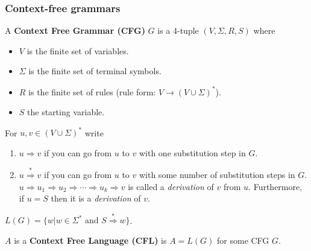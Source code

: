 \documentclass[11pt]{article}
\begin{document}
\subsubsection{Context-free grammars}
\begin{definition}
A \textbf{Context Free Grammar (CFG)} $G$ is a 4-tuple $(V,\Sigma,R,S)$ where
\begin{itemize}
    \item $V$ is the finite set of variables.
    \item $\Sigma$ is the finite set of terminal symbols.
    \item $R$ is the finite set of rules (rule form: $V\to (V\cup \Sigma)^{\ast}$).
    \item $S$ the starting variable.
\end{itemize}
For $u,v\in(V\cup\Sigma)^{\ast}$ write
\begin{enumerate}
    \item $u\Rightarrow v$ if you can go from $u$ to $v$ with one substitution step in $G$.
    \item $u\overset{\ast}{\Rightarrow} v$ if you can go from $u$ to $v$ with some number of substitution steps in $G$. \\
    $u\Rightarrow u_1\Rightarrow u_2\Rightarrow \cdots\Rightarrow u_k\Rightarrow v$ is called a \textit{derivation} of $v$ from $u$.
    Furthermore, if $u=S$ then it is a \textit{derivation} of $v$.
\end{enumerate}
$L(G)=\{w|w\in\Sigma^{\ast}\text{ and }S\overset{\ast}{\Rightarrow} w\}$.
\end{definition}
\begin{definition}
$A$ is a \textbf{Context Free Language (CFL)} is $A=L(G)$ for some CFG $G$.
\end{definition}
\end{document}
